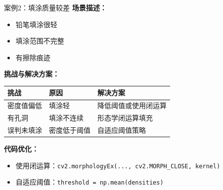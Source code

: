 \begin{frame}{案例2：填涂质量较差}
    \textbf{场景描述：}
    \begin{itemize}
        \item 铅笔填涂很轻
        \item 填涂范围不完整
        \item 有擦除痕迹
    \end{itemize}

    \vspace{0.3cm}

    \textbf{挑战与解决方案：}
    \begin{table}
        \centering
        \begin{tabular}{l|l|l}
        \toprule
        挑战 & 原因 & 解决方案 \\
        \midrule
        密度值偏低 & 填涂轻 & 降低阈值或使用闭运算 \\
        有孔洞 & 填涂不连续 & 形态学闭运算填充 \\
        误判未填涂 & 密度低于阈值 & 自适应阈值策略 \\
        \bottomrule
        \end{tabular}
    \end{table}

    \textbf{代码优化：}
    \begin{itemize}
        \item 使用闭运算：\texttt{cv2.morphologyEx(..., cv2.MORPH\_CLOSE, kernel)}
        \item 自适应阈值：\texttt{threshold = np.mean(densities)}
    \end{itemize}
\end{frame}

